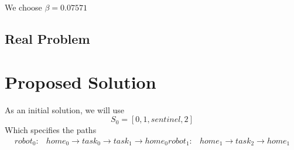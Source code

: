 \documentclass[a4paper]{article}
\begin{document}
We choose $\beta = 0.07571$

\subsection{Real Problem}



\section{Proposed Solution}

As an initial solution, we will use
$$S_0 = [0, 1, \mathit{sentinel}, 2 ]$$
Which specifies the paths
\begin{align*}
\mathit{robot}_0: & \mathit{home}_0 \rightarrow \mathit{task}_0 \rightarrow \mathit{task}_1 \rightarrow  \mathit{home}_0
\mathit{robot}_1: & \mathit{home}_1 \rightarrow \mathit{task}_2 \rightarrow \mathit{home}_1
\end{align*}




\end{document}
